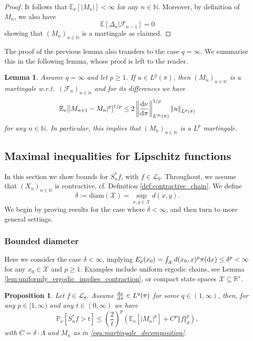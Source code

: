 \documentclass[12pt]{article}
\theoremstyle{plain}
\newtheorem{lem}[thm]{Lemma}
\newtheorem{prop}[thm]{Proposition}
\renewcommand{\d}{{\rm d}}
\newcommand{\norm}[1]{\left\Vert #1 \right\Vert}
\newcommand{\N}{\mathbb{N}}
\newcommand{\E}{\mathbb{E}}
\newcommand{\R}{\mathbb{R}}
\newcommand{\cX}{\mathcal{X}}
\begin{document}
{\begin{proof}
It follows that $\E_\nu[\vert M_n \vert] < \infty$ for any $n\in \N$. Moreover, by definition of $M_n$, we also have 
\[
\E [\Delta_n \vert \mathcal{F}_{n-1}] = 0
\]
showing that $(M_n)_{n \in \N}$ is a martingale as claimed. 
\end{proof}

The proof of the previous lemma also transfers to the case $q= \infty$. 
We summarise this in the following lemma, whose proof is left to the reader.
\begin{lem}\label{lem:martingale_bound_2}
Assume $q=\infty$ and let $p \geq 1$. 
If $u \in L^{p}(\pi)$, then $(M_n)_{n \in \N}$ is a martingale w.r.t.~$(\mathcal{F}_n)_{n \in \N}$ and for its differences we have
\[
\E_\nu[ \vert M_{n+1} - M_n \vert^p ]^{1/p} \leq 2\norm{\frac{\d \nu}{\d \pi}}_{L^\infty(\pi)}^{1/p} \norm{u}_{L^p(\pi)}
\]
for any $n \in \N$.
In particular, this implies that $(M_n)_{n \in \N}$ is a $L^p$ martingale. 
\end{lem}





\subsection{Maximal inequalities for Lipschitz functions}
In this section we show bounds for $S_n^* f$, with $f \in \mathscr{L}_0$.
Throughout, we assume that $(X_n)_{n \in \N}$ is contractive, cf. Definition \ref{def:contractive_chain}. 
We define 
\[
\delta := \text{diam}(\cX) = \sup_{x,y \in \cX} d(x,y) . 
\]
We begin by proving results for the case where $\delta<\infty$, and then turn to more general settings. 
\subsubsection{Bounded diameter}

Here we consider the case $\delta<\infty$, implying $E_p(x_0) = \int_{\cX} d(x_0, x)^p \pi(\d x) \leq \delta^p< \infty$ for any $x_0 \in \cX$ and $p\geq 1$. 
Examples include uniform ergodic chains, see Lemma \ref{lem:uniformly_ergodic_implies_contraction}, or compact state spaces $\cX \subseteq \R^s$. 


\begin{prop}\label{prop:Doob_maximal_bounded_diameter_general}
Let $f \in \mathscr{L}_0$. Assume $\frac{\d\nu}{\d \pi}\in L^q(\pi)$ for some $q \in (1, \infty)$, then, for any $p \in [1, \infty)$ and any $t \in (0, \infty)$ we have
\[
\mathbb{P}_\nu\left[  S_n^*f > t \right] \leq \left(\frac{2}{t}\right)^p\left( \E_\nu \left[\vert M_n\vert^p \right] + C^p\norm{f}_d^p \right),
\]
with $C=\delta \cdot \Lambda $ and $M_n$ as in \eqref{equ:martingale_decomposition}.


\end{prop}}
\end{document}
